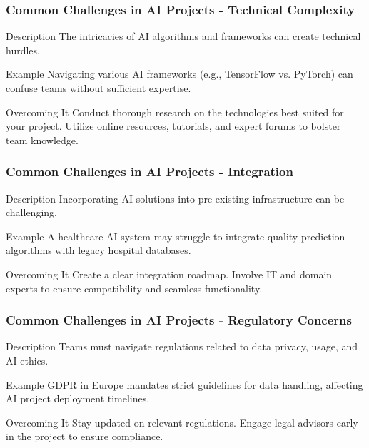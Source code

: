 \documentclass[aspectratio=169]{beamer}
\begin{document}
\begin{frame}[fragile]
    \frametitle{Common Challenges in AI Projects - Technical Complexity}
    \begin{block}{Description}
        The intricacies of AI algorithms and frameworks can create technical hurdles.
    \end{block}
    \begin{block}{Example}
        Navigating various AI frameworks (e.g., TensorFlow vs. PyTorch) can confuse teams without sufficient expertise.
    \end{block}
    \begin{block}{Overcoming It}
        Conduct thorough research on the technologies best suited for your project. Utilize online resources, tutorials, and expert forums to bolster team knowledge.
    \end{block}
\end{frame}

\begin{frame}[fragile]
    \frametitle{Common Challenges in AI Projects - Integration}
    \begin{block}{Description}
        Incorporating AI solutions into pre-existing infrastructure can be challenging.
    \end{block}
    \begin{block}{Example}
        A healthcare AI system may struggle to integrate quality prediction algorithms with legacy hospital databases.
    \end{block}
    \begin{block}{Overcoming It}
        Create a clear integration roadmap. Involve IT and domain experts to ensure compatibility and seamless functionality.
    \end{block}
\end{frame}

\begin{frame}[fragile]
    \frametitle{Common Challenges in AI Projects - Regulatory Concerns}
    \begin{block}{Description}
        Teams must navigate regulations related to data privacy, usage, and AI ethics.
    \end{block}
    \begin{block}{Example}
        GDPR in Europe mandates strict guidelines for data handling, affecting AI project deployment timelines.
    \end{block}
    \begin{block}{Overcoming It}
        Stay updated on relevant regulations. Engage legal advisors early in the project to ensure compliance.
    \end{block}
\end{frame}
\end{document}
